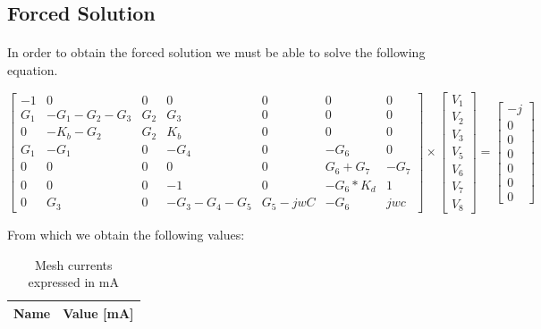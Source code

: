 \subsection{Forced Solution}

\paragraph{} In order to obtain the forced solution we must be able to solve the following equation.  

\begin{equation}
\begin{bmatrix}
	-1	&	0	&	0	&	0	&	0	&	0	&	0 \\
	G_1	&	-G_1 - G_2 - G_3	&	G_2	&	G_3	&	0	&	0	&	0 \\
	0	&	-K_b - G_2	&	G_2	&	K_b	&	0	&	0	&	0 \\
	G_1	&	-G_1	&	0	&	-G_4	&	0	&	-G_6	&	0 \\
	0	&	0	&	0	&	0	&	0	&	G_6 + G_7	&	-G_7 \\
	0	&	0	&	0	&	-1	&	0	&	-G_6 *	K_d	&	1 \\
	0	&	G_3	&	0	&	-G_3 - G_4 - G_5	&	G_5 - jwC	&	-G_6	&	jwc
\end{bmatrix}
\times
\begin{bmatrix}
	V_1 \\
	V_2 \\
	V_3 \\
	V_5 \\
	V_6 \\
	V_7 \\
	V_8
\end{bmatrix}
=
\begin{bmatrix}
	-j \\
	0 \\
	0 \\
	0 \\
	0 \\
	0 \\
	0
	\label{m:1}
\end{bmatrix}
\end{equation}

From which we obtain the following values:

\begin{table}[hbt!]
  \centering
  \begin{tabular}{|l|r|}
    \hline    
    {\bf Name} & {\bf Value [mA]} \\ \hline
    
  \end{tabular}
  \caption{Mesh currents expressed in mA}
  \label{tab:op}
\end{table}

